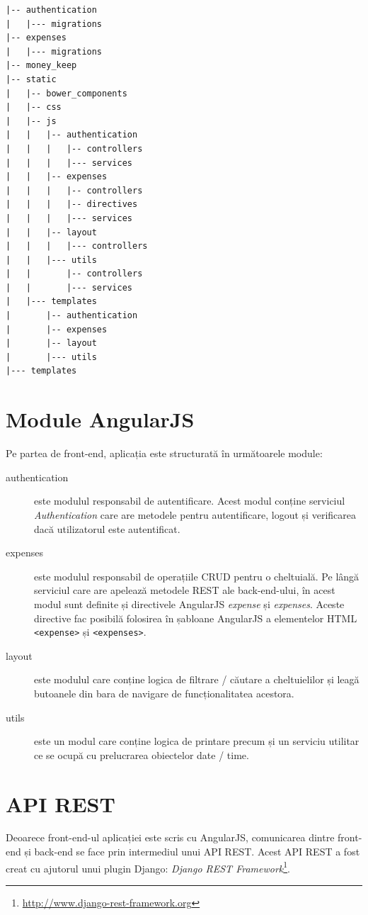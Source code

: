 \begin{lstlisting}[title=Structura de directoare a aplicației]
|-- authentication
|   |--- migrations
|-- expenses
|   |--- migrations
|-- money_keep
|-- static
|   |-- bower_components
|   |-- css
|   |-- js
|   |   |-- authentication
|   |   |   |-- controllers
|   |   |   |--- services
|   |   |-- expenses
|   |   |   |-- controllers
|   |   |   |-- directives
|   |   |   |--- services
|   |   |-- layout
|   |   |   |--- controllers
|   |   |--- utils
|   |       |-- controllers
|   |       |--- services
|   |--- templates
|       |-- authentication
|       |-- expenses
|       |-- layout
|       |--- utils
|--- templates
\end{lstlisting}


\section{Module AngularJS}

Pe partea de front-end, aplicația este structurată
în următoarele module:
\begin{description}
\item [authentication] este modulul responsabil de autentificare.
Acest modul conține serviciul \emph{Authentication} care are metodele
pentru autentificare, logout și verificarea dacă utilizatorul este
autentificat.
\item [expenses] este modulul responsabil de operațiile
CRUD pentru o cheltuială. Pe lângă serviciul care are apelează
metodele REST ale back-end-ului, în acest modul sunt definite și directivele
AngularJS \emph{expense} și \emph{expenses}. Aceste directive
fac posibilă folosirea în șabloane AngularJS a elementelor HTML
\texttt{<expense>} și \texttt{<expenses>}.
\item [layout] este modulul care conține logica de filtrare / căutare
a cheltuielilor și leagă butoanele din bara de navigare de funcționalitatea
acestora.
\item [utils] este un modul care conține logica de printare
precum și un serviciu utilitar ce se ocupă cu prelucrarea
obiectelor date / time.
\end{description} 

\section{API REST}

Deoarece front-end-ul aplicației este scris cu AngularJS,
comunicarea dintre front-end și back-end se face
prin intermediul unui API REST. Acest API REST a fost
creat cu ajutorul unui plugin Django: 
\emph{Django REST Framework}\footnote{\url{http://www.django-rest-framework.org}}.

